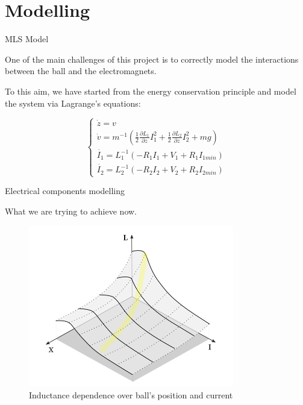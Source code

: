 \section{Modelling}

\begin{frame}{MLS Model}

    One of the main challenges of this project is to correctly model the interactions between the ball and the electromagnets.

    To this aim, we have started from the energy conservation principle and model the system via Lagrange's equations:

    \begin{equation}
        \begin{cases}
            \dot{z} = v                                                                                                                                 \\
            \dot{v} = m^{-1} \left(\frac{1}{2} \frac{\partial L_1}{\partial z} I_1^2 + \frac{1}{2} \frac{\partial L_2}{\partial z} I_2^2 + m g  \right) \\
            \dot{I_1} = L_1^{-1} \left(- R_1 I_1 + V_1 + R_1 I_{1min} \right)                                                                           \\
            \dot{I_2} = L_2^{-1} \left(- R_2 I_2 + V_2 + R_2 I_{2min} \right)
        \end{cases}
        \label{eq:reduced_equations_of_motion_final}
    \end{equation}

\end{frame}


\begin{frame}{Electrical components modelling}

    What we are trying to achieve now.

    \begin{figure}
        \centering
        \includegraphics[width=0.8\textwidth]{img/inductance_curve.jpg}
        \caption{Inductance dependence over ball's position and current}
    \end{figure}

\end{frame}